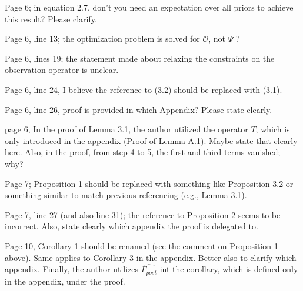 \documentclass{amsart}
\begin{document}
Page 6; in equation 2.7, don't you need an expectation over all priors
to achieve this result? Please clarify.
%

Page 6, line 13; the optimization problem is solved for $\mathcal{O}$,
not $\Psi$ ?  
  
Page 6, lines 19; the statement made about relaxing the constraints on
the observation operator is unclear.
%

Page 6, line 24, I believe the reference to (3.2) should be replaced
with (3.1).
%

Page 6, line 26, proof is provided in which Appendix? Please state
clearly.
%

page 6, In the proof of Lemma 3.1, the author utilized the operator
$T$, which is only introduced in the appendix (Proof of Lemma
A.1). Maybe state that clearly here. Also, in the proof, from step 4
to 5, the first and third terms vanished; why?
%

Page 7; Proposition 1 should be replaced with something like
Proposition 3.2 or something similar to match previous referencing
(e.g., Lemma 3.1). 

Page 7, line 27 (and also line 31); the reference to Proposition 2
seems to be incorrect. Also, state clearly which appendix the proof is
delegated to.  

Page 10, Corollary 1 should be renamed (see the comment on Proposition
1 above). Same applies to Corollary 3 in the appendix. Better also to
clarify which appendix. Finally, the author utilizes
$\widehat{\Gamma_{post}}$ int the corollary, which is defined only in
the appendix, under the proof. 
\end{document}
